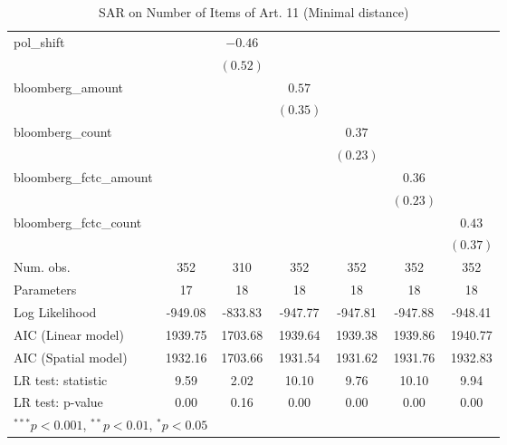 \begin{table}[!h]
\begin{center}
\begin{tabular}{l c c c c c c }
pol\_shift              &              & $-0.46$      &              &              &              &              \\
                        &              & $(0.52)$     &              &              &              &              \\
bloomberg\_amount       &              &              & $0.57$       &              &              &              \\
                        &              &              & $(0.35)$     &              &              &              \\
bloomberg\_count        &              &              &              & $0.37$       &              &              \\
                        &              &              &              & $(0.23)$     &              &              \\
bloomberg\_fctc\_amount &              &              &              &              & $0.36$       &              \\
                        &              &              &              &              & $(0.23)$     &              \\
bloomberg\_fctc\_count  &              &              &              &              &              & $0.43$       \\
                        &              &              &              &              &              & $(0.37)$     \\
\midrule
Num. obs.               & 352          & 310          & 352          & 352          & 352          & 352          \\
Parameters              & 17           & 18           & 18           & 18           & 18           & 18           \\
Log Likelihood          & -949.08      & -833.83      & -947.77      & -947.81      & -947.88      & -948.41      \\
AIC (Linear model)      & 1939.75      & 1703.68      & 1939.64      & 1939.38      & 1939.86      & 1940.77      \\
AIC (Spatial model)     & 1932.16      & 1703.66      & 1931.54      & 1931.62      & 1931.76      & 1932.83      \\
LR test: statistic      & 9.59         & 2.02         & 10.10        & 9.76         & 10.10        & 9.94         \\
LR test: p-value        & 0.00         & 0.16         & 0.00         & 0.00         & 0.00         & 0.00         \\
\bottomrule
\multicolumn{7}{l}{\scriptsize{$^{***}p<0.001$, $^{**}p<0.01$, $^*p<0.05$}}
\end{tabular}
\caption{SAR on Number of Items of Art. 11 (Minimal distance)}
\label{table:coefficients}
\end{center}
\end{table}
